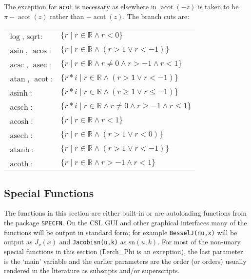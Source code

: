 The exception for \texttt{acot} is necessary as elsewhere in {\REDUCE}
$\mathop{\mathrm{acot}}(-z)$ is taken to be $\pi - \mathop{\mathrm{acot}}(z)$
rather than $-\mathop{\mathrm{acot}}(z)$.
The branch cuts are:\\
\begin{tabular}{ll}
  $\log$, $\mathrm{sqrt}$:     & $ \{r   \mid r \in\mathbb{R} \land r < 0\} $\\
  $\mathop{\mathrm{asin}}$, $\mathop{\mathrm{acos}}$: & $ \{r   \mid r \in\mathbb{R} \land (r > 1 \lor r < -1)\} $\\
  $\mathop{\mathrm{acsc}}$, $\mathop{\mathrm{asec}}$: & $ \{r   \mid r \in\mathbb{R} \land r \neq 0 \land r > -1 \land r < 1\} $\\
  $\mathop{\mathrm{atan}}$, $\mathop{\mathrm{acot}}$: & $ \{r*i \mid r \in\mathbb{R} \land (r > 1 \lor r < -1)\} $\\
  $\mathop{\mathrm{asinh}}$:         & $ \{r*i \mid r \in\mathbb{R} \land (r \geq  1 \lor r \leq  -1)\} $\\
  $\mathop{\mathrm{acsch}}$:         & $ \{r*i \mid r \in\mathbb{R} \land r \neq 0 \land r \geq  -1 \land r \leq  1\} $\\
  $\mathop{\mathrm{acosh}}$:         & $ \{r   \mid r \in\mathbb{R} \land r < 1\} $\\
  $\mathop{\mathrm{asech}}$:         & $ \{r   \mid r \in\mathbb{R} \land (r > 1 \lor r < 0)\} $\\
  $\mathop{\mathrm{atanh}}$:         & $ \{r   \mid r \in\mathbb{R} \land (r > 1 \lor r < -1)\} $\\
  $\mathop{\mathrm{acoth}}$:         & $ \{r   \mid r \in\mathbb{R} \land r > -1 \land r < 1\} $
\end{tabular}

\subsection{Special Functions}
The functions in this section are either built-in or are autoloading
functions from the package \texttt{SPECFN}. On the CSL GUI and other graphical
interfaces many of the functions will be output in standard form; for example
\texttt{BesselJ(nu,x)} will be output as $J_\nu(x)$ and \texttt{Jacobisn(u,k)}
as $\mathrm{sn}(u,k)$. For most of the non-unary special functions in this
section (\f{Lerch\_Phi} is an exception), the last parameter is the `main'
variable and the earlier parameters are the order (or orders)
usually rendered in the literature as subscipts and/or superscripts.

